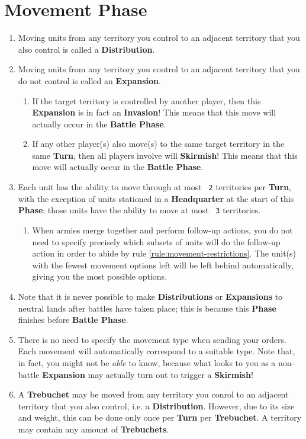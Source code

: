 \documentclass[10pt,openright,a4paper,openany]{article}
\newcommand{\num}[1]{\texttt{\color{purple} {#1}}}
\newcommand{\term}[1]{\textbf{\color{purple} #1}}
\newcommand{\headquarter}{\term{Headquarter}}
\begin{document}
\section{Movement Phase}\label{sec:movement}
\begin{enumerate}
	\item Moving units from any territory you control to an adjacent territory that you also control is called a \term{Distribution}.
	\item Moving units from any territory you control to an adjacent territory that you do not control is called an \term{Expansion}.
	\begin{enumerate}
		\item If the target territory is controlled by another player, then this \term{Expansion} is in fact an \term{Invasion}! This means that this move will actually occur in the \term{Battle Phase}.
		\item If any other player(s) also move(s) to the same target territory in the same \term{Turn}, then all players involve will \term{Skirmish}! This means that this move will actually occur in the \term{Battle Phase}.
	\end{enumerate}
	\item \label{rule:movement-restrictions}Each unit has the ability to move through at most \num{2} territories per \term{Turn}, with the exception of units stationed in a \headquarter{} at the start of this \term{Phase}; those units have the ability to move at most \num{3} territories.
	\begin{enumerate}
		\item When armies merge together and perform follow-up actions, you do not need to specify precisely which subsets of units will do the follow-up action in order to abide by rule \ref{rule:movement-restrictions}. The unit(s) with the fewest movement options left will be left behind automatically, giving you the most possible options.
	\end{enumerate}
	\item Note that it is never possible to make \term{Distributions} or \term{Expansions} to neutral lands after battles have taken place; this is because this \term{Phase} finishes before \term{Battle Phase}.
	\item There is no need to specify the movement type when sending your orders. Each movement will automatically correspond to a suitable type. Note that, in fact, you might not be \emph{able} to know, because what looks to you as a non-battle \term{Expansion} may actually turn out to trigger a \term{Skirmish}!
	\item \label{rule:trebuchet-move}A \term{Trebuchet} may be moved from any territory you conrol to an adjacent territory that you also control, i.e. a \term{Distribution}. However, due to its size and weight, this can be done only once per \term{Turn} per \term{Trebuchet}. A territory may contain any amount of \term{Trebuchets}.
\end{enumerate}
\end{document}
